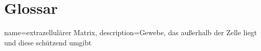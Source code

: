 \documentclass[a4paper, 12pt]{article}
\begin{document}
\nolinenumbers

\section{Glossar}

\renewcommand*{\glspostdescription}{}

\glsaddall

\printglossaries

{name=extrazellulärer Matrix,
 description={Gewebe, das außerhalb der Zelle liegt und diese schützend umgibt}}
\end{document}
